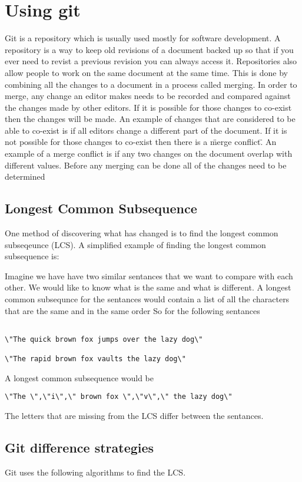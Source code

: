 
\chapter{Using git}
Git is a repository which is usually used mostly for software development.
A repository is a way to keep old revisions of a document backed up so that if you ever need to revist a previous revision you can always access it.
Repositories also allow people to work on the same document at the same time.
This is done by combining all the changes to a document in a process called merging. 
In order to merge, any change an editor makes needs to be recorded and compared against the changes made by other editors.
If it is possible for those changes to co-exist then the changes will be made.
An example of changes that are considered to be able to co-exist is if all editors change a different part of the document.
If it is not possible for those changes to co-exist then there is a \"merge conflict\".
An example of a merge conflict is if any two changes on the document overlap with different values.
Before any merging can be done all of the changes need to be determined 

\section{Longest Common Subsequence}
One method of discovering what has changed is to find the longest common subseqeunce (LCS).
A simplified example of finding the longest common subsequence is:

Imagine we have have two similar sentances that we want to compare with each other.  
We would like to know what is the same and what is different.
A longest common subsequnce for the sentances would contain a list of all the characters that are the same and in the same order
So for the following sentances

\begin{verbatim}

\"The quick brown fox jumps over the lazy dog\"

\"The rapid brown fox vaults the lazy dog\"

\end{verbatim}
A longest common subsequence would be
\begin{verbatim}
\"The \",\"i\",\" brown fox \",\"v\",\" the lazy dog\"
\end{verbatim}
The letters that are missing from the LCS differ between the sentances.

\section{Git difference strategies}
Git uses the following algorithms to find the LCS.

